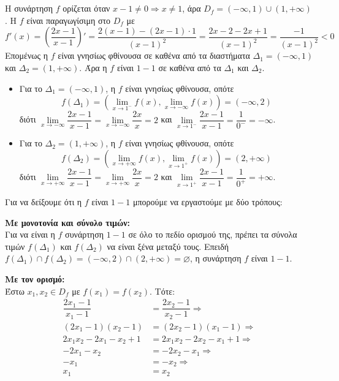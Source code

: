 \\\\
\lysh
Η συνάρτηση $f$ ορίζεται όταν $x-1\neq 0\Rightarrow x\neq 1$, άρα $D_f=(-\infty,1)\cup(1,+\infty)$. Η $f$ είναι παραγωγίσιμη στο $D_f$ με
\[ f'(x)=\left(\dfrac{2x-1}{x-1}\right)'=\dfrac{2(x-1)-(2x-1)\cdot 1}{(x-1)^2}=\dfrac{2x-2-2x+1}{(x-1)^2}=\dfrac{-1}{(x-1)^2}<0 \]
Επομένως η $f$ είναι γνησίως φθίνουσα σε καθένα από τα διαστήματα $\varDelta_1=(-\infty,1)$ και $\varDelta_2=(1,+\infty)$. 
Άρα η $f$ είναι $1-1$ σε καθένα από τα $\varDelta_1$ και $\varDelta_2$.
\begin{itemize}
\item Για το $\varDelta_1=(-\infty,1)$, η $f$ είναι γνησίως φθίνουσα, οπότε 
\[ f(\varDelta_1)=\left(\lim\limits_{x\to 1^-}f(x),\lim\limits_{x\to-\infty}f(x)\right)=(-\infty,2) \]
διότι $\lim\limits_{x\to-\infty}\dfrac{2x-1}{x-1}=\lim\limits_{x\to-\infty}\dfrac{2x}{x}=2$ και $\lim\limits_{x\to 1^-}\dfrac{2x-1}{x-1}=\dfrac{1}{0^-}=-\infty$.
\item Για το $\varDelta_2=(1,+\infty)$, η $f$ είναι γνησίως φθίνουσα, οπότε
\[ f(\varDelta_2)=\left(\lim\limits_{x\to+\infty}f(x),\lim\limits_{x\to 1^+}f(x)\right)=(2,+\infty) \]
διότι $\lim\limits_{x\to+\infty}\dfrac{2x-1}{x-1}=\lim\limits_{x\to+\infty}\dfrac{2x}{x}=2$ και $\lim\limits_{x\to 1^+}\dfrac{2x-1}{x-1}=\dfrac{1}{0^+}=+\infty$.
\end{itemize}
Για να δείξουμε ότι η $f$ είναι $1-1$ μπορούμε να εργαστούμε με δύο τρόπους:
\begin{tropos}
\item 
\textbf{Με μονοτονία και σύνολο τιμών:}\\
Για να είναι η $f$ συνάρτηση $1-1$ σε όλο το πεδίο ορισμού της, πρέπει τα σύνολα τιμών $f(\varDelta_1)$ και $f(\varDelta_2)$ να είναι ξένα μεταξύ τους. Επειδή $f(\varDelta_1)\cap f(\varDelta_2)=(-\infty,2)\cap(2,+\infty)=\varnothing$, η συνάρτηση $f$ είναι $1-1$.

\item \textbf{Με τον ορισμό:}\\
Έστω $x_1,x_2\in D_f$ με $f(x_1)=f(x_2)$. Τότε:
\begin{align*}
\dfrac{2x_1-1}{x_1-1}&=\dfrac{2x_2-1}{x_2-1}\Rightarrow\\
(2x_1-1)(x_2-1)&=(2x_2-1)(x_1-1)\Rightarrow\\
2x_1x_2-2x_1-x_2+1&=2x_1x_2-2x_2-x_1+1\Rightarrow\\
-2x_1-x_2&=-2x_2-x_1\Rightarrow\\
-x_1&=-x_2\Rightarrow \\x_1&=x_2
\end{align*}
\end{tropos}
